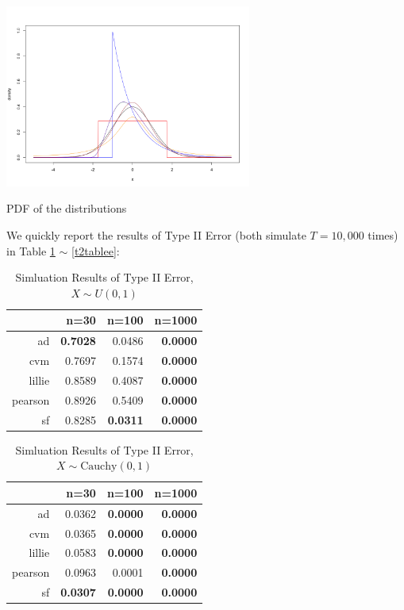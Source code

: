 \documentclass[twoside]{article}
\begin{document}
\begin{center}
\makeatletter
\def\@captype{figure}
\makeatother
\includegraphics [height=6cm]{code/density.png}
\caption{PDF of the distributions}
\label{den}
\end{center}

We quickly report the results of Type II Error (both simulate $T=10,000$ times) in Table \ref{t2tableb} $\sim$ \ref{t2tablee}:

\begin{table}[ht]
\centering
\begin{tabular}{rrrr}
  \hline
 & n=30 & n=100 & n=1000 \\ 
  \hline
ad & \textbf{0.7028} & 0.0486 & \textbf{0.0000} \\ 
  cvm & 0.7697 & 0.1574 & \textbf{0.0000} \\ 
  lillie & 0.8589 & 0.4087 & \textbf{0.0000} \\ 
  pearson & 0.8926 & 0.5409 & \textbf{0.0000} \\ 
  sf & 0.8285 & \textbf{0.0311} & \textbf{0.0000} \\ 
   \hline
\end{tabular}
\caption{Simluation Results of Type II Error, $X\sim U(0,1)$}
\label{t2tableb}
\end{table}

\begin{table}[ht]
\centering
\begin{tabular}{rrrr}
  \hline
 & n=30 & n=100 & n=1000 \\ 
  \hline
ad & 0.0362 & \textbf{0.0000} & \textbf{0.0000} \\ 
  cvm & 0.0365 & \textbf{0.0000} & \textbf{0.0000} \\ 
  lillie & 0.0583 & \textbf{0.0000} & \textbf{0.0000} \\ 
  pearson & 0.0963 & 0.0001 & \textbf{0.0000} \\ 
  sf & \textbf{0.0307} & \textbf{0.0000} & \textbf{0.0000} \\ 
   \hline
\end{tabular}
\caption{Simluation Results of Type II Error, $X\sim \mathrm{Cauchy}(0,1)$}
\end{table}
\end{document}
